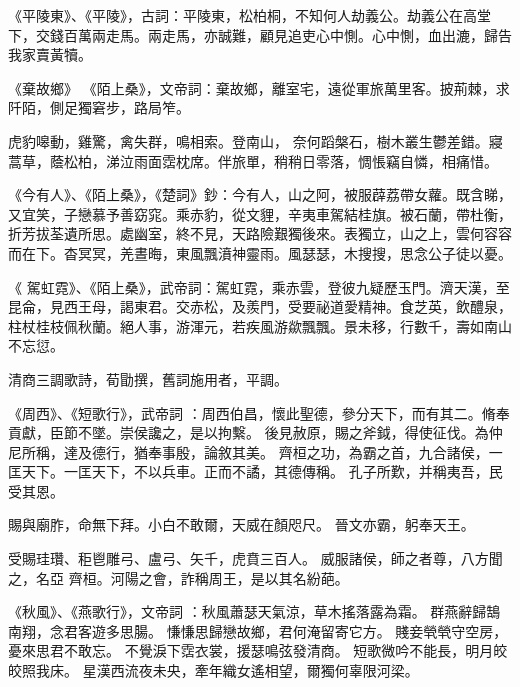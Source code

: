 \begin{pinyinscope}
 《平陵東》、《平陵》，古詞：平陵東，松柏桐，不知何人劫義公。劫義公在高堂下，交錢百萬兩走馬。兩走馬，亦誠難，顧見追吏心中惻。心中惻，血出漉，歸告我家賣黃犢。


《棄故鄉》
 《陌上桑》，文帝詞：棄故鄉，離室宅，遠從軍旅萬里客。披荊棘，求阡陌，側足獨窘步，路局笮。



 虎豹嗥動，雞驚，禽失群，鳴相索。登南山，
 奈何蹈槃石，樹木叢生鬱差錯。寢蒿草，蔭松柏，涕泣雨面霑枕席。伴旅單，稍稍日零落，惆悵竊自憐，相痛惜。



 《今有人》、《陌上桑》，《楚詞》鈔：今有人，山之阿，被服薜荔帶女蘿。既含睇，又宜笑，子戀慕予善窈窕。乘赤豹，從文貍，辛夷車駕結桂旗。被石蘭，帶杜衡，折芳拔荃遺所思。處幽室，終不見，天路險艱獨後來。表獨立，山之上，雲何容容而在下。杳冥冥，羌晝晦，東風飄濆神靈雨。風瑟瑟，木搜搜，思念公子徒以憂。



 《
 駕虹霓》、《陌上桑》，武帝詞：駕虹霓，乘赤雲，登彼九疑歷玉門。濟天漢，至昆侖，見西王母，謁東君。交赤松，及羨門，受要祕道愛精神。食芝英，飲醴泉，柱杖桂枝佩秋蘭。絕人事，游渾元，若疾風游歘飄飄。景未移，行數千，壽如南山不忘愆。



 清商三調歌詩，荀勖撰，舊詞施用者，平調。


《周西》、《短歌行》，武帝詞
 ：周西伯昌，懷此聖德，參分天下，而有其二。脩奉貢獻，臣節不墜。崇侯讒之，是以拘繫。
 後見赦原，賜之斧鉞，得使征伐。為仲尼所稱，達及德行，猶奉事殷，論敘其美。
 齊桓之功，為霸之首，九合諸侯，一匡天下。一匡天下，不以兵車。正而不譎，其德傳稱。
 孔子所歎，并稱夷吾，民受其恩。


賜與廟胙，命無下拜。小白不敢爾，天威在顏咫尺。
 晉文亦霸，躬奉天王。


受賜珪瓚、秬鬯雕弓、盧弓、矢千，虎賁三百人。
 威服諸侯，師之者尊，八方聞之，名亞
 齊桓。河陽之會，詐稱周王，是以其名紛葩。


《秋風》、《燕歌行》，文帝詞
 ：秋風蕭瑟天氣涼，草木搖落露為霜。
 群燕辭歸鵠南翔，念君客遊多思腸。
 慊慊思歸戀故鄉，君何淹留寄它方。
 賤妾煢煢守空房，憂來思君不敢忘。
 不覺淚下霑衣裳，援瑟鳴弦發清商。
 短歌微吟不能長，明月皎皎照我床。
 星漢西流夜未央，牽年織女遙相望，爾獨何辜限河梁。



\end{pinyinscope}
